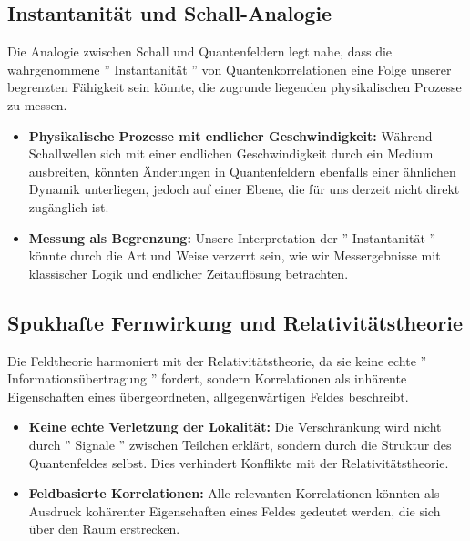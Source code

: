 \documentclass[12pt,a4paper]{article}
\begin{document}
	\subsection{Instantanität und Schall-Analogie}
	Die Analogie zwischen Schall und Quantenfeldern legt nahe, dass die wahrgenommene '' Instantanität '' von Quantenkorrelationen eine Folge unserer begrenzten Fähigkeit sein könnte, die zugrunde liegenden physikalischen Prozesse zu messen.
	\begin{itemize}
		\item \textbf{Physikalische Prozesse mit endlicher Geschwindigkeit:} Während Schallwellen sich mit einer endlichen Geschwindigkeit durch ein Medium ausbreiten, könnten Änderungen in Quantenfeldern ebenfalls einer ähnlichen Dynamik unterliegen, jedoch auf einer Ebene, die für uns derzeit nicht direkt zugänglich ist.
		\item \textbf{Messung als Begrenzung:} Unsere Interpretation der '' Instantanität '' könnte durch die Art und Weise verzerrt sein, wie wir Messergebnisse mit klassischer Logik und endlicher Zeitauflösung betrachten.
	\end{itemize}
	
	\subsection{Spukhafte Fernwirkung und Relativitätstheorie}
	Die Feldtheorie harmoniert mit der Relativitätstheorie, da sie keine echte '' Informationsübertragung '' fordert, sondern Korrelationen als inhärente Eigenschaften eines übergeordneten, allgegenwärtigen Feldes beschreibt.
	\begin{itemize}
		\item \textbf{Keine echte Verletzung der Lokalität:} Die Verschränkung wird nicht durch '' Signale '' zwischen Teilchen erklärt, sondern durch die Struktur des Quantenfeldes selbst. Dies verhindert Konflikte mit der Relativitätstheorie.
		\item \textbf{Feldbasierte Korrelationen:} Alle relevanten Korrelationen könnten als Ausdruck kohärenter Eigenschaften eines Feldes gedeutet werden, die sich über den Raum erstrecken.
	\end{itemize}
	
\end{document}
